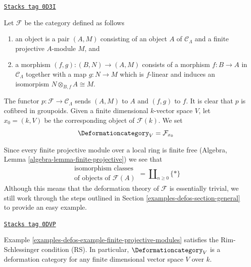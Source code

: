 \begin{example}

\label{examples-defos-example-finite-projective-modules}
\href{https://stacks.math.columbia.edu/tag/0D3I}{\texttt{Stacks tag 0D3I}}

Let $\mathcal{F}$ be the category defined as follows
\begin{enumerate}
\item an object is a pair $(A, M)$ consisting of an
object $A$ of $\mathcal{C}_\Lambda$ and a
finite projective $A$-module $M$, and
\item a morphism $(f, g) : (B, N) \to (A, M)$ consists of
a morphism $f : B \to A$ in $\mathcal{C}_\Lambda$ together
with a map $g : N \to M$ which is $f$-linear and induces
an isomorpism $N \otimes_{B, f} A \cong M$.
\end{enumerate}
The functor $p : \mathcal{F} \to \mathcal{C}_\Lambda$ sends $(A, M)$ to $A$
and $(f, g)$ to $f$. It is clear that $p$ is cofibred in groupoids.
Given a finite dimensional $k$-vector space $V$,
let $x_0 = (k, V)$ be the corresponding object of $\mathcal{F}(k)$.
We set
$$
\Deformationcategory_V = \mathcal{F}_{x_0}
$$
\end{example}

Since every finite projective module over a local ring is finite free
(Algebra, Lemma \ref{algebra-lemma-finite-projective})
we see that
$$
\begin{matrix}
\text{isomorphism classes} \\
\text{of objects of }\mathcal{F}(A)
\end{matrix}
= \coprod\nolimits_{n \geq 0} \{*\}
$$
Although this means that the deformation theory of $\mathcal{F}$
is essentially trivial, we still work through the steps outlined
in Section \ref{examples-defos-section-general} to provide an easy example.

\begin{lemma}
\label{examples-defos-lemma-finite-projective-modules-RS}
\href{https://stacks.math.columbia.edu/tag/0DVP}{\texttt{Stacks tag 0DVP}}

Example \ref{examples-defos-example-finite-projective-modules}
satisfies the Rim-Schlessinger condition (RS).
In particular, $\Deformationcategory_V$ is a deformation category
for any finite dimensional vector space $V$ over $k$.
\end{lemma}

